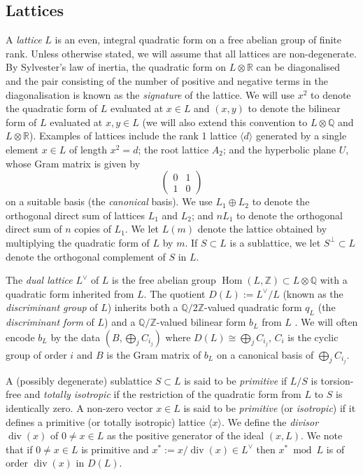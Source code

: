 \documentclass[11pt]{article}
\newcommand{\RR}{\mathbb{R}}
\newcommand{\ZZ}{\mathbb{Z}}
\newcommand{\QQ}{\mathbb{Q}}
\newcommand{\la}{\langle}
\newcommand{\ra}{\rangle}
\newcommand{\opn}{\operatorname}
\newcommand{\op}{\oplus}
\newcommand{\beq}{\begin{equation*}}
\newcommand{\eeq}{\end{equation*}}
\newcommand{\bpm}{\begin{pmatrix}}
\newcommand{\epm}{\end{pmatrix}}
\begin{document}
\subsection{Lattices}
A \emph{lattice} $L$ is an even, integral quadratic form on a free abelian group of finite rank.
Unless otherwise stated, we will assume that all lattices are non-degenerate.
By Sylvester's law of inertia, the quadratic form on $L \otimes \RR$ can be diagonalised and the pair consisting of the number of positive and negative terms in the diagonalisation is known as the \emph{signature} of the lattice.
We will use $x^2$ to denote the quadratic form of $L$ evaluated at $x \in L$ and $(x,y)$ to denote the bilinear form of $L$ evaluated at $x,y \in L$ (we will also extend this convention to $L \otimes \QQ$ and $L \otimes \RR$).
Examples of lattices include the rank 1 lattice $\la d \ra$ generated by a single element $x \in L$ of length $x^2 = d$; the root lattice $A_2$; and the hyperbolic plane $U$, whose Gram matrix is given by
\beq
\bpm 0 & 1 \\ 1 & 0 \epm
\eeq
on a suitable basis (the \emph{canonical} basis).
We use $L_1 \op L_2$ to denote the  orthogonal direct sum of lattices $L_1$ and $L_2$; and $nL_1$ to denote the  orthogonal direct sum of $n$ copies of $L_1$.
We let $L(m)$ denote the lattice obtained by multiplying the quadratic form of $L$ by $m$.
If $S \subset L$ is a sublattice, we let $S^{\perp} \subset L$ denote the orthogonal complement of $S$ in $L$.

The \emph{dual lattice} $L^{\vee}$ of $L$ is the free abelian group $\opn{Hom}(L, \ZZ) \subset L \otimes \QQ$ with a  quadratic form inherited from $L$.
The quotient $D(L):=L^{\vee}/L$ (known as the \emph{discriminant group} of $L$)  inherits both a $\QQ/2\ZZ$-valued quadratic form $q_L$ (the \emph{discriminant form} of $L$) and a $\QQ/\ZZ$-valued bilinear form $b_L$ from $L$ \cite{Nikulin}.
We will often encode $b_L$ by the data $(B, \bigoplus_j C_{i_j})$ where $D(L) \cong \bigoplus_j C_{i_j}$, $C_i$ is the cyclic group of order $i$ and $B$ is the Gram matrix of $b_L$ on a canonical basis of $\bigoplus_j C_{i_j}$.


A (possibly degenerate) sublattice $S \subset L$ is said to be \emph{primitive} if $L/S$ is torsion-free and \emph{totally isotropic} if the restriction of the quadratic form from $L$ to $S$ is identically zero.
A non-zero vector $x \in  L$ is said to be \emph{primitive} (or \emph{isotropic}) if it defines a primitive (or totally isotropic) lattice $\la x \ra$.
We define the \emph{divisor} $\opn{div}(x)$ of $0 \neq x \in L$  as the positive generator of the ideal $(x, L)$.
We note that if $0 \neq x \in L$ is primitive and $x^*:=x/\opn{div}(x) \in L^{\vee}$ then $x^* \bmod {L}$ is of order  $\opn{div}(x)$ in $D(L)$.
\end{document}
